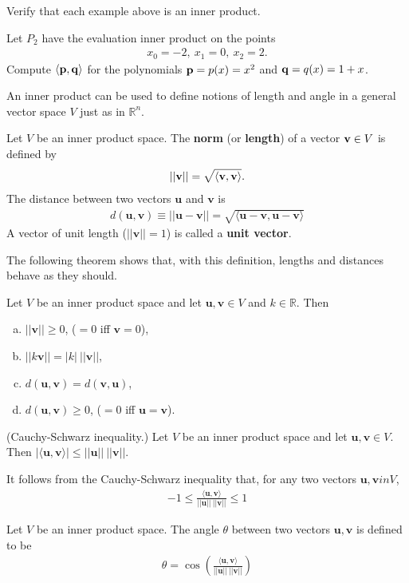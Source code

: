 \documentclass[12pt,letterpaper,reqno]{article}
\numberwithin{equation}{section}
\newcommand{\bv}{\mathbf{v}}
\newcommand{\bu}{\mathbf{u}}
\begin{document}
\begin{exercise}
	Verify that each example above is an inner product.
\end{exercise}

\begin{exercise}
	Let $P_2$ have the evaluation inner product on the points
	\begin{align*}
		x_0=-2, \ x_1 = 0, \ x_2=2.
	\end{align*}
	Compute $\langle {\bf p}, {\bf q}\rangle$ for the polynomials ${\bf p}=p(x)=x^2$ and ${\bf q}=q(x)=1+x$.
\end{exercise}
An inner product can be used to define notions of length and angle in a general vector space $V$ just as in $\mathbb{R}^n$.

\begin{defn}
	Let $V$ be an inner product space. The {\bf norm} (or {\bf length}) of a vector ${\bf v} \in V$ is defined by
	\begin{align*}
		||\bv||=\sqrt{\langle {\bf v}, {\bf v}\rangle}.
	\end{align*}
	The distance between two vectors $\bu$ and $\bv$ is 
	\begin{align*}
		d(\bu,\bv)\equiv||\bu-\bv||=\sqrt{\langle \bu-\bv,\bu-\bv \rangle}
	\end{align*}
	A vector of unit length ($||\bv || =1$) is called a {\bf unit vector}.
\end{defn}
The following theorem shows that, with this definition, lengths and distances behave as they should.
\begin{thm}
	Let $V$ be an inner product space and let $\bu,\bv \in V$ and $k \in \mathbb{R}$. Then
	\begin{enumerate}[(a)]
		\item $||\bv|| \geq 0$, ($=0$ iff $\bv=0$),
		\item $||k\bv||=|k| \ ||\bv||$,
		\item $d(\bu,\bv)=d(\bv,\bu)$,
		\item $d(\bu,\bv) \geq 0$, ($=0$ iff $\bu=\bv$).
	\end{enumerate}
\end{thm}

\begin{lem}
	(Cauchy-Schwarz inequality.) Let $V$ be an inner product space and let $\bu,\bv \in V$. Then $|\langle \bu,\bv \rangle| \leq ||\bu || \ ||\bv||$.	 
\end{lem}
It follows from the Cauchy-Schwarz inequality that, for any two vectors $\bu,\bv in V$,
\begin{align*}
	-1 \leq \frac{\langle \bu,\bv \rangle}{||\bu|| \ ||\bv||} \leq 1
\end{align*}
\begin{defn}
	Let $V$ be an inner product space. The angle $\theta$ between two vectors $\bu, \bv$ is defined to be
	\begin{align*}
		\theta=\cos\left(\frac{\langle \bu, \bv \rangle}{||\bu|| \ ||\bv||}\right)
	\end{align*}
\end{defn}
\end{document}
